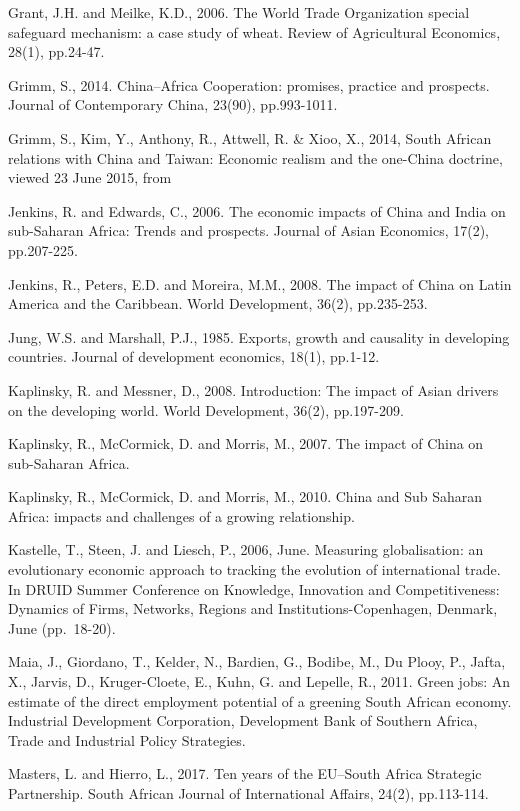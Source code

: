 \documentclass[11pt,preprint, authoryear]{elsarticle}
\numberwithin{equation}{section}
\numberwithin{figure}{section}
\numberwithin{table}{section}
\begin{document}
Grant, J.H. and Meilke, K.D., 2006. The World Trade Organization special
safeguard mechanism: a case study of wheat. Review of Agricultural
Economics, 28(1), pp.24-47.

Grimm, S., 2014. China--Africa Cooperation: promises, practice and
prospects. Journal of Contemporary China, 23(90), pp.993-1011.

Grimm, S., Kim, Y., Anthony, R., Attwell, R. \& Xioo, X., 2014, South
African relations with China and Taiwan: Economic realism and the
one-China doctrine, viewed 23 June 2015, from

Jenkins, R. and Edwards, C., 2006. The economic impacts of China and
India on sub-Saharan Africa: Trends and prospects. Journal of Asian
Economics, 17(2), pp.207-225.

Jenkins, R., Peters, E.D. and Moreira, M.M., 2008. The impact of China
on Latin America and the Caribbean. World Development, 36(2),
pp.235-253.

Jung, W.S. and Marshall, P.J., 1985. Exports, growth and causality in
developing countries. Journal of development economics, 18(1), pp.1-12.

Kaplinsky, R. and Messner, D., 2008. Introduction: The impact of Asian
drivers on the developing world. World Development, 36(2), pp.197-209.

Kaplinsky, R., McCormick, D. and Morris, M., 2007. The impact of China
on sub-Saharan Africa.

Kaplinsky, R., McCormick, D. and Morris, M., 2010. China and Sub Saharan
Africa: impacts and challenges of a growing relationship.

Kastelle, T., Steen, J. and Liesch, P., 2006, June. Measuring
globalisation: an evolutionary economic approach to tracking the
evolution of international trade. In DRUID Summer Conference on
Knowledge, Innovation and Competitiveness: Dynamics of Firms, Networks,
Regions and Institutions-Copenhagen, Denmark, June (pp.~18-20).

Maia, J., Giordano, T., Kelder, N., Bardien, G., Bodibe, M., Du Plooy,
P., Jafta, X., Jarvis, D., Kruger-Cloete, E., Kuhn, G. and Lepelle, R.,
2011. Green jobs: An estimate of the direct employment potential of a
greening South African economy. Industrial Development Corporation,
Development Bank of Southern Africa, Trade and Industrial Policy
Strategies.

Masters, L. and Hierro, L., 2017. Ten years of the EU--South Africa
Strategic Partnership. South African Journal of International Affairs,
24(2), pp.113-114.
\end{document}
